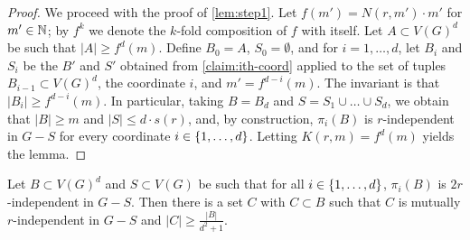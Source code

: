 \begin{proof}
We proceed with the proof of \cref{lem:step1}.
Let $f(m')=N(r,m')\cdot m'$ for $m'\in\mathbb{N}$; by $f^k$ we denote the $k$-fold composition of $f$ with itself.
Let $A\subset V(G)^d$ be such that $|A|\ge f^d(m)$. 
Define $B_0=A$, $S_0=\emptyset$, and for $i=1,\ldots,d$,
let $B_{i}$ and $S_i$ be the $B'$ and $S'$ obtained from \cref{claim:ith-coord} applied to the set of tuples $B_{i-1}\subset V(G)^d$, the coordinate $i$, and $m'=f^{d-i}(m)$. 
The invariant is that $|B_i|\ge f^{d-i}(m)$.
In particular, 
taking $B=B_d$ and $S=S_1\cup\ldots \cup S_d$, we obtain that $|B|\ge m$ and $|S|\le d\cdot s(r)$, and, by construction, $\pi_i(B)$
is $r$-independent in $G-S$ for every coordinate $i\in\{1,\ldots,d\}$. Letting $K(r,m)=f^d(m)$ yields the lemma.
\end{proof}


\begin{lemma}\label{lem:step2}
	Let $B\subset V(G)^d$ and $S\subset V(G)$ be such that 
   for all $i\in \{1,\ldots,d\}$,
	$\pi_i(B)$ is $2r$-independent in $G-S$.
	Then there is a set $C$ with $C\subset B$ 
	such that $C$ is mutually $r$-independent in $G-S$
	and $|C|\geq\frac{|B|}{d^2+1}$.
\end{lemma}
